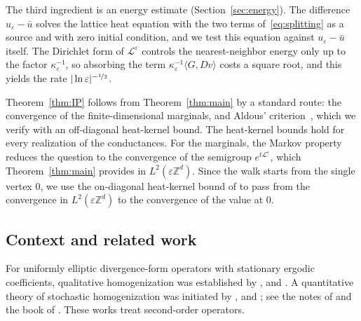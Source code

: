 \documentclass[11pt]{amsart}
\numberwithin{equation}{section}
\newcommand{\Z}{\mathbb{Z}}
\newcommand{\eps}{\varepsilon}
\newcommand{\Leps}{\mathcal{L}^\varepsilon}
\newcommand{\nf}{\nicefrac}
\begin{document}
The third ingredient is an energy estimate (Section~\ref{sec:energy}).
The difference $u_\eps - \bar u$ solves the lattice heat equation with the two terms of~\eqref{eq:splitting} as a source and with zero initial condition, and we test this equation against $u_\eps - \bar u$ itself.
The Dirichlet form of $\Leps$ controls the nearest-neighbor energy only up to the factor $\kappa_\eps^{-1}$, so absorbing the term $\kappa_\eps^{-1} \langle G, D v \rangle$ costs a square root, and this yields the rate $|\ln \eps|^{-\nf12}$.

Theorem~\ref{thm:IP} follows from Theorem~\ref{thm:main} by a standard route: the convergence of the finite-dimensional marginals, and Aldous' criterion~\citep{Aldous1978}, which we verify with an off-diagonal heat-kernel bound.
The heat-kernel bounds hold for every realization of the conductances.
For the marginals, the Markov property reduces the question to the convergence of the semigroup $e^{t \Leps}$, which Theorem~\ref{thm:main} provides in $L^2(\eps \Z^d)$.
Since the walk starts from the single vertex $0$, we use the on-diagonal heat-kernel bound of \citet{MSC2015} to pass from the convergence in $L^2(\eps \Z^d)$ to the convergence of the value at $0$.

\subsection{Context and related work}

For uniformly elliptic divergence-form operators with stationary ergodic coefficients, qualitative homogenization was established by \citet{Kozlov1979}, \citet{PapanicolaouVaradhan1981} and \citet{Yurinskii1980}.
A quantitative theory of stochastic homogenization was initiated by \citet{GO1,GO2}, \citet*{GloriaNeukammOtto2015} and \citet{ArmstrongSmart2016}; see the notes of \citet{ArmstrongKuusi2022} and the book of \citet*{AKM2019}.
These works treat second-order operators.
\end{document}
